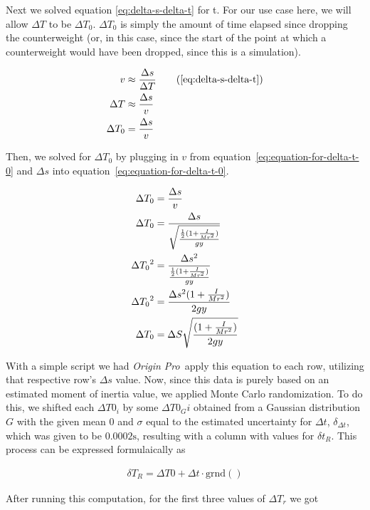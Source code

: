 \documentclass[coverpage]{article}
\newcommand{\softwareText}[1]{\textit{#1}\texttrademark}
\newcommand{\origin}{\softwareText{Origin Pro}}
\begin{document}
	Next we solved equation \ref{eq:delta-s-delta-t} for t. For our use case here, we will allow $\Delta{T}$ to be $\Delta{T_0}$. $\Delta{T_0}$ is simply the amount of time elapsed since dropping the counterweight (or, in this case, since the start of the point at which a counterweight would have been dropped, since this is a simulation).
	
	\begin{align}
		v&\approx \frac{\Delta{s}}{\Delta{T}} \tag{\ref{eq:delta-s-delta-t}} \\
		\Delta{T}&\approx \frac{\Delta{s}}{v} \notag \\
		\Delta{T_0}&= \frac{\Delta{s}}{v} \label{eq:equation-for-delta-t-0}
	\end{align}
	
	Then, we solved for $\Delta{T_0}$ by plugging in $v$ from equation~\ref{eq:equation-for-delta-t-0} and $\Delta{s}$ into equation~\ref{eq:equation-for-delta-t-0}.
	
	\begin{align}
		\Delta{T_0}&= \frac{\Delta{s}}{v} \notag \\
		\Delta{T_0}&= \frac{\Delta{s}}{\sqrt{\frac{\frac{1}{2}(1 + \frac{I}{Mr^2})}{gy}}} \notag \\
		\Delta{T_0}^2&= \frac{\Delta{s}^2}{\frac{\frac{1}{2}(1 + \frac{I}{Mr^2})}{gy}} \notag \\
		\Delta{T_0}^2&= \frac{\Delta{s}^2 (1 + \frac{I}{M r^2})}{2gy} \notag \\
		\Delta{T_0}&= \Delta{S} \sqrt{\frac{(1 + \frac{I}{M r^2})}{2gy}}
	\end{align}

	With a simple script we had \origin~apply this equation to each row, utilizing that respective row's $\Delta{s}$ value. Now, since this data is purely based on an estimated moment of inertia value, we applied Monte Carlo randomization. To do this, we shifted each $\Delta{T0_i}$ by some $\Delta{T0_Gi}$ obtained from a Gaussian distribution $G$ with the given mean $0$ and $\sigma$ equal to the estimated uncertainty for $\Delta{t}$, $\delta_{\Delta{t}}$, which was given to be $0.0002 \text{s}$, resulting with a column with values for $\delta{t_R}$. This process can be expressed formulaically as
	
	\begin{align}
		\delta{T_R} = \Delta{T0} + \Delta{t} \cdot \text{grnd}()
	\end{align}

	After running this computation, for the first three values of $\Delta{T_r}$ we got
\end{document}
